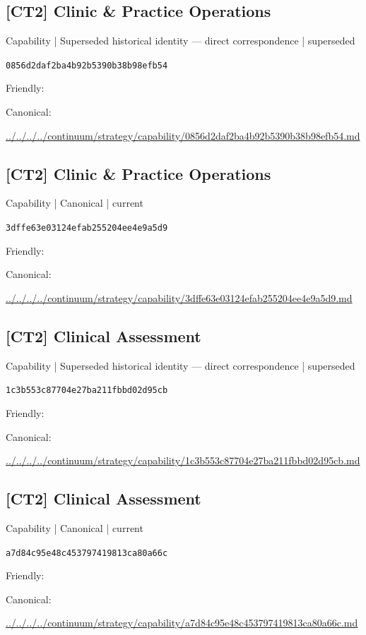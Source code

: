 \documentclass[10pt,a4paper]{article}
\begin{document}
\subsection*{[CT2] Clinic \& Practice Operations}
{\small Capability | Superseded historical identity — direct correspondence | superseded}\par
\texttt{0856d2daf2ba4b92b5390b38b98efb54}\par
Friendly: \par
Canonical: \par
{\footnotesize\url{../../../../continuum/strategy/capability/0856d2daf2ba4b92b5390b38b98efb54.md}}\par
\subsection*{[CT2] Clinic \& Practice Operations}
{\small Capability | Canonical | current}\par
\texttt{3dffe63e03124efab255204ee4e9a5d9}\par
Friendly: \par
Canonical: \par
{\footnotesize\url{../../../../continuum/strategy/capability/3dffe63e03124efab255204ee4e9a5d9.md}}\par
\subsection*{[CT2] Clinical Assessment}
{\small Capability | Superseded historical identity — direct correspondence | superseded}\par
\texttt{1c3b553c87704e27ba211fbbd02d95cb}\par
Friendly: \par
Canonical: \par
{\footnotesize\url{../../../../continuum/strategy/capability/1c3b553c87704e27ba211fbbd02d95cb.md}}\par
\subsection*{[CT2] Clinical Assessment}
{\small Capability | Canonical | current}\par
\texttt{a7d84c95e48c453797419813ca80a66c}\par
Friendly: \par
Canonical: \par
{\footnotesize\url{../../../../continuum/strategy/capability/a7d84c95e48c453797419813ca80a66c.md}}\par
\end{document}
